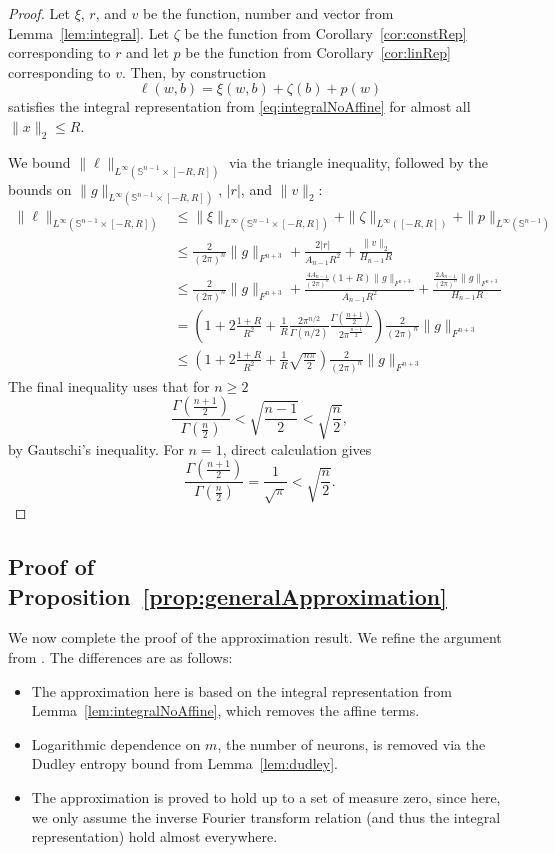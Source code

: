 \documentclass[twoside]{article}
\theoremstyle{definition}
\renewcommand{\S}{\mathbb{S}}
\newcommand{\1}[1]{\scalebox{1.25}{$\mathds{1}$}\left[#1\right]}
\begin{document}
\begin{proof}
Let $\xi$, $r$, and $v$ be the function, number and vector from Lemma~\ref{lem:integral}. Let $\zeta$ be the function from Corollary~\ref{cor:constRep} corresponding to $r$ and let $p$ be the function from Corollary~\ref{cor:linRep} corresponding to $v$. Then, by construction
$$
\ell(w,b)=\xi(w,b)+\zeta(b)+p(w)
$$
satisfies the integral representation from \eqref{eq:integralNoAffine} for almost all $\|x\|_2\le R$. 

We bound $\|\ell\|_{L^{\infty}(\S^{n-1}\times [-R,R])}$ via the triangle inequality, followed by the bounds on $\|g\|_{L^{\infty}(\S^{n-1}\times [-R,R])}$, $|r|$, and $\|v\|_2$:
\begin{align*}
\|\ell\|_{L^{\infty}(\S^{n-1}\times [-R,R])}&\le \|\xi\|_{L^{\infty}(\S^{n-1}\times[-R,R])}
+\|\zeta\|_{L^{\infty}([-R,R])}+\|p\|_{L^{\infty}(\S^{n-1})} \\
&\le \frac{2}{(2\pi)^n}\|g\|_{F^{n+3}}+\frac{2|r|}{A_{n-1}R^2}+\frac{\|v\|_2}{H_{n-1}R} \\
&\le \frac{2}{(2\pi)^n}\|g\|_{F^{n+3}}+\frac{\frac{4A_{n-1}}{(2\pi)^n}\left( 1+ R\right) \|g\|_{F^{n+3}}}{A_{n-1}R^2}
+\frac{\frac{ 2 A_{n-1}}{(2\pi)^n} \|g\|_{F^{n+3}} }{H_{n-1}R}\\
&=\left(1+2\frac{1+R}{R^2}+\frac{1}{R}\frac{2\pi^{n/2}}{\Gamma(n/2)}\frac{\Gamma\left(\frac{n+1}{2}\right)}{2 \pi^{\frac{n-1}{2}}}\right)
\frac{2}{(2\pi)^n}
\|g\|_{F^{n+3}}
\\
&\le 
\left(1+2\frac{1+ R}{R^2}+\frac{1}{R}\sqrt{\frac{n\pi}{2}}\right)
\frac{2}{(2\pi)^n}
\|g\|_{F^{n+3}}
\end{align*}
The final inequality uses that for $n\ge 2$
$$
\frac{\Gamma\left(\frac{n+1}{2}\right)}{\Gamma\left(\frac{n}{2}\right)}< \sqrt{\frac{n-1}{2}}
<\sqrt{\frac{n}{2}},
$$
by Gautschi's inequality. For $n=1$, direct calculation gives
$$
\frac{\Gamma\left(\frac{n+1}{2}\right)}{\Gamma\left(\frac{n}{2}\right)}=\frac{1}{\sqrt{\pi}}<
\sqrt{\frac{n}{2}}.
$$
\end{proof}

\subsection{Proof of Proposition~\ref{prop:generalApproximation}}
\label{apss:approximationPf}

We now complete the proof of the approximation result. We refine the argument from \cite{lamperski2024functiongradientapproximationrandom}. The differences are as follows:
\begin{itemize}
\item The approximation here is based on the integral representation from Lemma~\ref{lem:integralNoAffine}, which removes the affine terms.
\item Logarithmic dependence  on $m$, the number of neurons, is removed via the Dudley entropy bound from Lemma~\ref{lem:dudley}.
\item  The approximation is proved to hold up to a set of measure zero, since here, we only assume the inverse Fourier transform relation (and thus the integral representation) hold almost everywhere.
\end{itemize}
\end{document}
